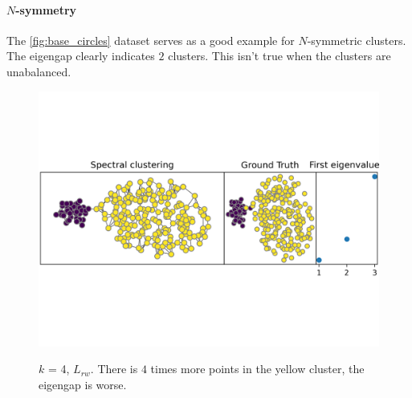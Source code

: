 \documentclass[a4paper,12pt]{article}
\theoremstyle{definition}
\theoremstyle{plain}
\begin{document}
\paragraph{$N$-symmetry}
The \ref{fig:base_circles} dataset serves as a good example for $N$-symmetric clusters. The eigengap clearly indicates $2$ clusters.
This isn't true when the clusters are unabalanced.

\begin{figure}[H]
	\centering
	\includegraphics[width=0.6\linewidth]{figures/4x_asym_blobs_rw}
	\label{fig:mid_asym_blobs_rw}
	\caption{$k$ = 4, $L_{rw}$. There is $4$ times more points in the yellow cluster, the eigengap is worse.}
\end{figure}
\end{document}
